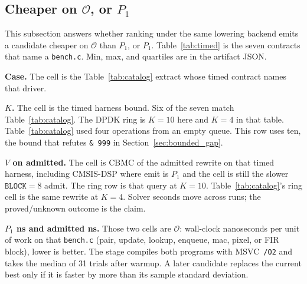 \subsection{Cheaper on \(\mathcal{O}\), or \(P_1\)}
\label{sec:ring_eval}

This subsection answers whether ranking under the same lowering backend
emits a candidate cheaper on \(\mathcal{O}\) than \(P_1\), or \(P_1\).
Table~\ref{tab:timed} is the seven contracts that name a \texttt{bench.c}.
Min, max, and quartiles are in the artifact JSON.

\begin{table}
\caption{Contracts that name a \texttt{bench.c}, ordered by emit ratio,
\(P_1\) last. Columns are the extract, \(K\) on the timed harness, CBMC on
the admitted program, median wall-clock ns per unit of work of \(P_1\) and
of the admit under MSVC~\texttt{/O2}, and emit.}
\label{tab:timed}

\end{table}

\textbf{Case.} The cell is the Table~\ref{tab:catalog} extract whose timed
contract names that driver.

{\bfseries\boldmath\(K\).} The cell is the timed harness bound. Six of the
seven match Table~\ref{tab:catalog}. The DPDK ring is \(K=10\) here and
\(K=4\) in that table. Table~\ref{tab:catalog} used four operations from
an empty queue. This row uses ten, the bound that refutes
\texttt{\& 999} in Section~\ref{sec:bounded_gap}.

{\bfseries\boldmath\(V\) on admitted.} The cell is CBMC of the admitted
rewrite on that timed harness, including CMSIS-DSP where emit is \(P_1\)
and the cell is still the slower \(\texttt{BLOCK}=8\) admit. The ring row
is that query at \(K=10\). Table~\ref{tab:catalog}'s ring cell is the same
rewrite at \(K=4\). Solver seconds move across runs; the proved/unknown
outcome is the claim.

{\bfseries\boldmath\(P_1\) ns and admitted ns.} Those two cells are
\(\mathcal{O}\): wall-clock nanoseconds per unit of work on that
\texttt{bench.c} (pair, update, lookup, enqueue, mac, pixel, or FIR
block), lower is better. The stage compiles both programs with
MSVC~\texttt{/O2} and takes the median of 31 trials after warmup. A later
candidate replaces the current best only if it is faster by more than its
sample standard deviation.

